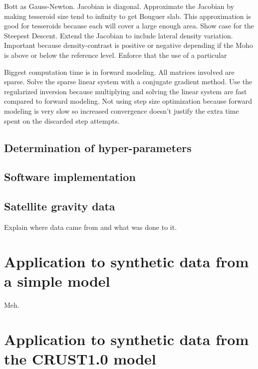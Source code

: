 \documentclass[extra]{gji}
\begin{document}
Bott as Gauss-Newton.
Jacobian is diagonal.
Approximate the Jacobian by making tesseroid size tend to infinity to get
Bouguer slab.
This approximation is good for tesseroids because each will cover a large
enough area.
Show case for the Steepest Descent.
Extend the Jacobian to include lateral density variation.
Important because density-contrast is positive or negative depending if the
Moho is above or below the reference level.
Enforce that the use of a particular

Biggest computation time is in forward modeling.
All matrices involved are sparse.
Solve the sparse linear system with a conjugate gradient method.
Use the regularized inversion because multiplying and solving the linear system
are fast compared to forward modeling.
Not using step size optimization because forward modeling is very slow so
increased convergence doesn't justify the extra time spent on the discarded
step attempts.

\subsection{Determination of hyper-parameters}



\subsection{Software implementation}


\subsection{Satellite gravity data}


Explain where data came from and what was done to  it.


\section{Application to synthetic data from a simple model}


Meh.


\section{Application to synthetic data from the CRUST1.0 model}
\end{document}
